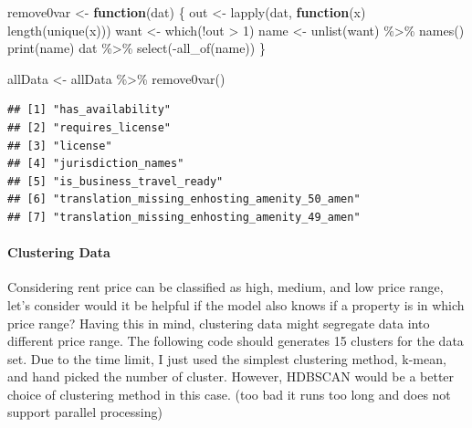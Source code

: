 \documentclass[
]{article}
\newenvironment{Shaded}{\begin{snugshade}}{\end{snugshade}}
\newcommand{\ControlFlowTok}[1]{\textcolor[rgb]{0.13,0.29,0.53}{\textbf{#1}}}
\newcommand{\DecValTok}[1]{\textcolor[rgb]{0.00,0.00,0.81}{#1}}
\newcommand{\FunctionTok}[1]{\textcolor[rgb]{0.00,0.00,0.00}{#1}}
\newcommand{\NormalTok}[1]{#1}
\newcommand{\OtherTok}[1]{\textcolor[rgb]{0.56,0.35,0.01}{#1}}
\newcommand{\SpecialCharTok}[1]{\textcolor[rgb]{0.00,0.00,0.00}{#1}}
\begin{document}
\begin{Shaded}
\begin{Highlighting}[]
\NormalTok{remove0var }\OtherTok{\textless{}{-}} \ControlFlowTok{function}\NormalTok{(dat) \{}
\NormalTok{    out }\OtherTok{\textless{}{-}} \FunctionTok{lapply}\NormalTok{(dat, }\ControlFlowTok{function}\NormalTok{(x) }\FunctionTok{length}\NormalTok{(}\FunctionTok{unique}\NormalTok{(x)))}
\NormalTok{    want }\OtherTok{\textless{}{-}} \FunctionTok{which}\NormalTok{(}\SpecialCharTok{!}\NormalTok{out }\SpecialCharTok{\textgreater{}} \DecValTok{1}\NormalTok{)}
\NormalTok{    name }\OtherTok{\textless{}{-}} \FunctionTok{unlist}\NormalTok{(want) }\SpecialCharTok{\%\textgreater{}\%} \FunctionTok{names}\NormalTok{()}
    \FunctionTok{print}\NormalTok{(name)}
\NormalTok{    dat }\SpecialCharTok{\%\textgreater{}\%} \FunctionTok{select}\NormalTok{(}\SpecialCharTok{{-}}\FunctionTok{all\_of}\NormalTok{(name))}
\NormalTok{\}}

\NormalTok{allData }\OtherTok{\textless{}{-}}\NormalTok{ allData }\SpecialCharTok{\%\textgreater{}\%} \FunctionTok{remove0var}\NormalTok{()}
\end{Highlighting}
\end{Shaded}

\begin{verbatim}
## [1] "has_availability"                             
## [2] "requires_license"                             
## [3] "license"                                      
## [4] "jurisdiction_names"                           
## [5] "is_business_travel_ready"                     
## [6] "translation_missing_enhosting_amenity_50_amen"
## [7] "translation_missing_enhosting_amenity_49_amen"
\end{verbatim}

\hypertarget{clustering-data}{%
\paragraph{Clustering Data}\label{clustering-data}}

Considering rent price can be classified as high, medium, and low price
range, let's consider would it be helpful if the model also knows if a
property is in which price range? Having this in mind, clustering data
might segregate data into different price range. The following code
should generates 15 clusters for the data set. Due to the time limit, I
just used the simplest clustering method, k-mean, and hand picked the
number of cluster. However, HDBSCAN would be a better choice of
clustering method in this case. (too bad it runs too long and does not
support parallel processing)
\end{document}
